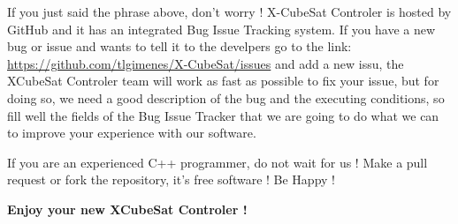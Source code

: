 \documentclass[pdftex,11pt,a4paper,titlepage]{report}
\begin{document}
If you just said the phrase above, don't worry ! X-CubeSat Controler is hosted by GitHub and it has an integrated Bug Issue Tracking system. If you have a new bug or issue and wants to tell it to the develpers go to the link: \url{https://github.com/tlgimenes/X-CubeSat/issues} and add a new issu, the XCubeSat Controler team will work as fast as possible to fix your issue, but for doing so, we need a good description of the bug and the executing conditions, so fill well the fields of the Bug Issue Tracker that we are going to do what we can to improve your experience with our software.

If you are an experienced C++ programmer, do not wait for us ! Make a pull request or fork the repository, it's free software ! Be Happy !

\vspace{10cm}
\hspace{6cm}
\textbf{Enjoy your new XCubeSat Controler !}
\end{document}
